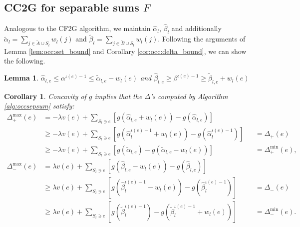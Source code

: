 \documentclass{article} %
\newcommand{\hogwild}{CF2G}
\newcommand{\occ}{CC2G}
\newtheorem{cor}[thm]{Corollary}
\newtheorem{lem}[thm]{Lemma}
\begin{document}
\subsection{\occ{} for separable sums $F$}
Analogous to the \hogwild{} algorithm, we maintain $\hat\alpha_l$, $\hat\beta_l$ and additionally $\tilde\alpha_l = \sum_{j\in \tilde{A}\cup S_l} w_l(j)$ and $\tilde\beta_l = \sum_{j \in \tilde{B}\cup S_l} w_l(j)$.
Following the arguments of Lemma \ref{lem:occ:set_bound} and Corollary \ref{cor:occ:delta_bound}, we can show the following.
\begin{lem} $\hat\alpha_{l,e} \leq \alpha^{\iota(e)-1} \leq \tilde\alpha_{l,e} - w_l(e)$ and $\hat\beta_{l,e} \geq \beta^{\iota(e)-1} \geq \tilde\beta_{l,e} + w_l(e)$
\end{lem}

\begin{cor} Concavity of $g$ implies that the $\Delta$'s computed by Algorithm \ref{alg:occsepsum} satisfy:
\begin{align*}
\Delta_+^{\max}(e)
&= - \lambda v(e) + \sum_{S_l \ni e} \left[g(\hat\alpha_{l,e} + w_l(e)) - g(\hat\alpha_{l,e})\right]\\
&\geq - \lambda v(e) + \sum_{S_l \ni e} \left[g(\hat\alpha_l^{\iota(e)-1} + w_l(e)) - g(\hat\alpha_l^{\iota(e)-1})\right]
&&= \Delta_+(e)\\
&\geq - \lambda v(e) + \sum_{S_l \ni e} \left[g(\tilde\alpha_{l,e}) - g(\tilde\alpha_{l,e} - w_l(e))\right]
&&= \Delta_+^{\min}(e),\\
\Delta_-^{\max}(e)
&= \lambda v(e) + \sum_{S_l \ni e} \left[g(\hat\beta_{l,e} - w_l(e)) - g(\hat\beta_{l,e})\right]\\
&\geq \lambda v(e) + \sum_{S_l \ni e} \left[g(\hat\beta_l^{\iota(e)-1} - w_l(e)) - g(\hat\beta_l^{\iota(e)-1})\right]
&&= \Delta_-(e)\\
&\geq \lambda v(e) + \sum_{S_l \ni e} \left[g(\tilde\beta_l^{\iota(e)-1}) - g(\tilde\beta_l^{\iota(e)-1} + w_l(e))\right]
&&= \Delta_-^{\min}(e).
\end{align*}
\end{cor}


\newpage

\newpage
\end{document}
